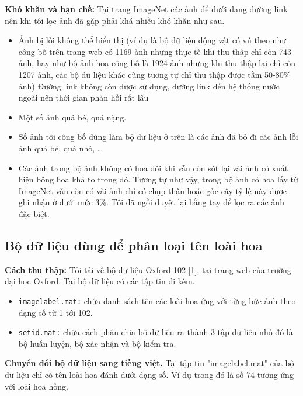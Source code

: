 \documentclass[12pt]{report}
\begin{document}
				
		\textbf{Khó khăn và hạn chế:} Tại trang ImageNet các ảnh để dưới dạng đường link nên khi tôi lọc ảnh đã gặp phải khá nhiều khó khăn như sau.
		\begin{itemize}
			\item Ảnh bị lỗi không thể hiển thị (ví dụ là bộ dữ liệu động vật có vú theo như công bố trên trang web có 1169 ảnh nhưng thực tế khi thu thập chỉ còn 743 ảnh, hay như bộ ảnh hoa công bố là 1924 ảnh nhưng khi thu thập lại chỉ còn 1207 ảnh, các bộ dữ liệu khác cũng tương tự chỉ thu thập được tầm 50-80\% ảnh) Đường link không còn được sử dụng, đường link đến hệ thống nước ngoài nên thời gian phản hồi rất lâu
			\item Một số ảnh quá bé, quá nặng.
			\item Số ảnh tôi công bố dùng làm bộ dữ liệu ở trên là các ảnh đã bỏ đi các ảnh lỗi ảnh quá bé, quá nhỏ, …
			\item Các ảnh trong bộ ảnh không có hoa đôi khi vẫn còn sót lại vài ảnh có xuất hiện bông hoa khá to trong đó. Tương tự như vậy, trong bộ ảnh có hoa lấy từ ImageNet vẫn còn có vài ảnh chỉ có chụp thân hoặc gốc cây tỷ lệ này được ghi nhận ở dưới mức 3\%. Tôi đã ngồi duyệt lại bằng tay để lọc ra các ảnh đặc biệt.
		\end{itemize}
				
					
		\subsection{Bộ dữ liệu dùng để phân loại tên loài hoa}
						
		\textbf{Cách thu thập:} Tôi tải về bộ dữ liệu Oxford-102 [1], tại trang web của trường đại học Oxford. Tại bộ dữ liệu có các tập tin đi kèm.
		\begin{itemize}
			\item \texttt{imagelabel.mat:} chứa danh sách tên các loài hoa ứng với từng bức ảnh theo dạng số từ 1 tới 102.
			\item \texttt{setid.mat:} chứa cách phân chia bộ dữ liệu ra thành 3 tập dữ liệu nhỏ đó là bộ huấn luyện, bộ xác nhận và bộ kiểm tra.
		\end{itemize}
				
		\textbf{Chuyển đổi bộ dữ liệu sang tiếng việt.}
		Tại tập tin "imagelabel.mat" của bộ dữ liệu chỉ có tên loài hoa đánh dưới dạng số. Ví dụ trong đó là số 74 tương ứng với loài hoa hồng.
				
\end{document}
